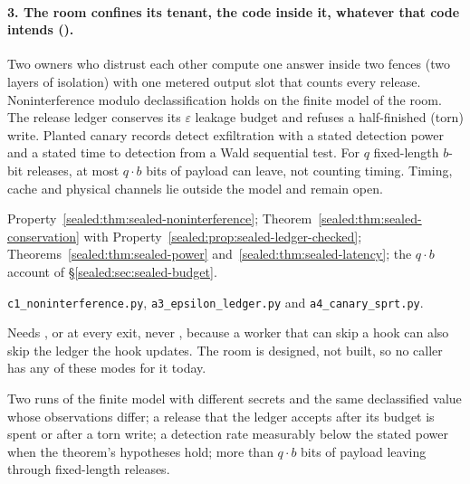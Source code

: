 \paragraph{3. The room confines its tenant, the code inside it, whatever that code intends ().}
Two owners who distrust each other compute one answer inside two fences (two
layers of isolation) with one metered output slot that counts every release.
Noninterference modulo declassification holds on the finite model of the
room. The release ledger conserves its $\varepsilon$ leakage budget and
refuses a half-finished (torn) write. Planted canary records detect
exfiltration with a stated detection power and a stated time to detection from
a Wald sequential test. For $q$ fixed-length $b$-bit releases, at most
$q\cdot b$ bits of payload can leave, not counting timing. Timing, cache and
physical channels lie outside the model and remain open.
\begin{description}[leftmargin=1.4em,itemsep=1pt]
  \item[Result] Property~\ref{sealed:thm:sealed-noninterference};
  Theorem~\ref{sealed:thm:sealed-conservation} with
  Property~\ref{sealed:prop:sealed-ledger-checked};
  Theorems~\ref{sealed:thm:sealed-power} and~\ref{sealed:thm:sealed-latency};
  the $q\cdot b$ account of \S\ref{sealed:sec:sealed-budget}.
  \item[Artifact] \texttt{c1\_noninterference.py}, \texttt{a3\_epsilon\_ledger.py}
  and \texttt{a4\_canary\_sprt.py}.
  \item[Mode] Needs ,  or
   at every exit, never ,
  because a worker that can skip a hook can also skip the ledger the hook
  updates. The room is designed, not built, so no caller has any of these
  modes for it today.
  \item[Falsifier] Two runs of the finite model with different secrets and the
  same declassified value whose observations differ; a release that the ledger
  accepts after its budget is spent or after a torn write; a detection rate
  measurably below the stated power when the theorem's hypotheses hold; more
  than $q\cdot b$ bits of payload leaving through fixed-length releases.
\end{description}

